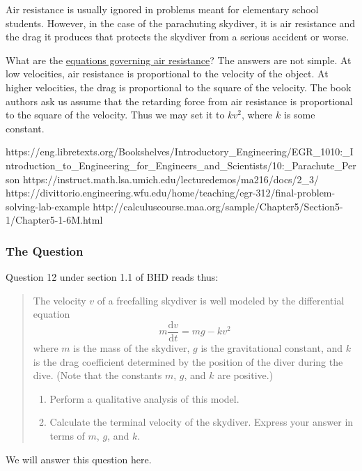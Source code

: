 \documentclass[
  a4paper,
]{article}
\begin{document}
Air resistance is usually ignored in problems meant for elementary
school students. However, in the case of the parachuting skydiver, it is
air resistance and the drag it produces that protects the skydiver from
a serious accident or worse.

What are the
\href{https://en.wikipedia.org/wiki/Drag_(physics)}{equations governing
air resistance}? The answers are not simple. At low velocities, air
resistance is proportional to the velocity of the object. At higher
velocities, the drag is proportional to the square of the velocity. The
book authors ask us assume that the retarding force from air resistance
is proportional to the square of the velocity. Thus we may set it to
\(kv^2\), where \(k\) is some constant.

https://eng.libretexts.org/Bookshelves/Introductory\_Engineering/EGR\_1010:\_Introduction\_to\_Engineering\_for\_Engineers\_and\_Scientists/10:\_Parachute\_Person
https://instruct.math.lsa.umich.edu/lecturedemos/ma216/docs/2\_3/
https://divittorio.engineering.wfu.edu/home/teaching/egr-312/final-problem-solving-lab-example
http://calculuscourse.maa.org/sample/Chapter5/Section5-1/Chapter5-1-6M.html

\subsubsection{The Question}\label{the-question}

Question 12 under section 1.1 of BHD reads thus:

\begin{quote}
The velocity \(v\) of a freefalling skydiver is well modeled by the
differential equation \[
m\frac{\mathrm{d}v}{\mathrm{d}t} = mg - kv^2
\] where \(m\) is the mass of the skydiver, \(g\) is the gravitational
constant, and \(k\) is the drag coefficient determined by the position
of the diver during the dive. (Note that the constants \(m\), \(g\), and
\(k\) are positive.)

\begin{enumerate}
\def\labelenumi{(\alph{enumi})}
\item
  Perform a qualitative analysis of this model.
\item
  Calculate the terminal velocity of the skydiver. Express your answer
  in terms of \(m\), \(g\), and \(k\).
\end{enumerate}
\end{quote}

We will answer this question here.
\end{document}
